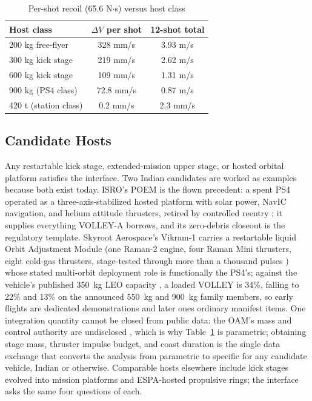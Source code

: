 \documentclass[conference]{IEEEtran}
\begin{document}
\begin{table}[t]
\caption{Per-shot recoil (65.6 N$\cdot$s) versus host class}
\label{tab:recoil}
\centering\footnotesize
\begin{tabular}{lcc}
\toprule
Host class & $\Delta V$ per shot & 12-shot total\\
\midrule
200 kg free-flyer & 328 mm/s & 3.93 m/s\\
300 kg kick stage & 219 mm/s & 2.62 m/s\\
600 kg kick stage & 109 mm/s & 1.31 m/s\\
900 kg (PS4 class) & 72.8 mm/s & 0.87 m/s\\
420 t (station class) & 0.2 mm/s & 2.3 mm/s\\
\bottomrule
\end{tabular}
\end{table}

\subsection{Candidate Hosts}
Any restartable kick stage, extended-mission upper stage, or hosted orbital platform satisfies the interface. Two Indian candidates are worked as examples because both exist today. ISRO's POEM is the flown precedent: a spent PS4 operated as a three-axis-stabilized hosted platform with solar power, NavIC navigation, and helium attitude thrusters, retired by controlled reentry \cite{poem3,poem4}; it supplies everything VOLLEY-A borrows, and its zero-debris closeout is the regulatory template. Skyroot Aerospace's Vikram-1 carries a restartable liquid Orbit Adjustment Module (one Raman-2 engine, four Raman Mini thrusters, eight cold-gas thrusters, stage-tested through more than a thousand pulses \cite{oam}) whose stated multi-orbit deployment role is functionally the PS4's; against the vehicle's published 350~kg LEO capacity \cite{spacenews}, a loaded VOLLEY is 34\%, falling to 22\% and 13\% on the announced 550~kg and 900~kg family members, so early flights are dedicated demonstrations and later ones ordinary manifest items. One integration quantity cannot be closed from public data: the OAM's mass and control authority are undisclosed \cite{oam}, which is why Table~\ref{tab:recoil} is parametric; obtaining stage mass, thruster impulse budget, and coast duration is the single data exchange that converts the analysis from parametric to specific for any candidate vehicle, Indian or otherwise. Comparable hosts elsewhere include kick stages evolved into mission platforms and ESPA-hosted propulsive rings; the interface asks the same four questions of each.
\end{document}
